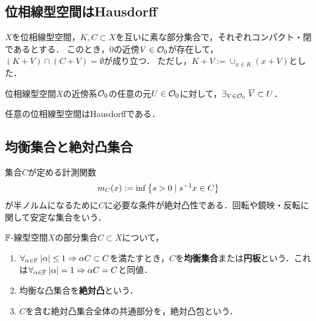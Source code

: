 \documentclass[uplatex,dvipdfmx]{jsreport}
\begin{document}
\subsection{位相線型空間はHausdorff}

\begin{lemma}[コンパクト集合と閉集合の開近傍による分離]
    $X$を位相線型空間，$K,C\subset X$を互いに素な部分集合で，それぞれコンパクト・閉であるとする．
    このとき，$0$の近傍$V\in\mathcal{O}_0$が存在して，$(K+V)\cap (C+V)=\emptyset$が成り立つ．
    ただし，$K+V:=\cup_{x\in K}(x+V)$とした．
\end{lemma}

\begin{corollary}
    位相線型空間$X$の近傍系$\mathcal{O}_0$の任意の元$U\in\mathcal{O}_0$に対して，$\exists_{V\in\mathcal{O}_0}\;\overline{V}\subset U$．
\end{corollary}

\begin{corollary}
    任意の位相線型空間はHausdorffである．
\end{corollary}

\subsection{均衡集合と絶対凸集合}

\begin{tcolorbox}[colframe=ForestGreen, colback=ForestGreen!10!white,breakable,colbacktitle=ForestGreen!40!white,coltitle=black,fonttitle=\bfseries\sffamily,
    title=]
    集合$C$が定める計測関数
    \[m_C(x):=\inf\left\{s>0\mid s^{-1}x\in C\right\}\]
    が半ノルムになるために$C$に必要な条件が絶対凸性である．回転や鏡映・反転に関して安定な集合をいう．
\end{tcolorbox}

\begin{definition}
    $\mathbb{F}$-線型空間$X$の部分集合$C\subset X$について，
    \begin{enumerate}
        \item $\forall_{\alpha\in\mathbb{F}}\;\lvert\alpha\rvert\le 1\Rightarrow\alpha C\subset C$を満たすとき，$C$を\textbf{均衡集合}または\textbf{円板}という．これは$\forall_{\alpha\in\mathbb{F}}\;\lvert\alpha\rvert=1\Rightarrow\alpha C=C$と同値．
        \item 均衡な凸集合を\textbf{絶対凸}という．
        \item $C$を含む絶対凸集合全体の共通部分を，絶対凸包という．
    \end{enumerate}
\end{definition}
\end{document}
